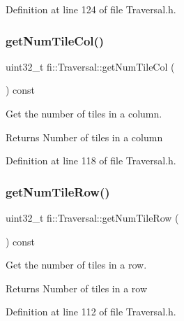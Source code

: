 Definition at line 124 of file Traversal.\+h.

\mbox{\label{classfi_1_1Traversal_a10eeefd5098ddd5871617d4df9875255}} 
\subsubsection{\texorpdfstring{get\+Num\+Tile\+Col()}{getNumTileCol()}}
{\footnotesize\ttfamily uint32\+\_\+t fi\+::\+Traversal\+::get\+Num\+Tile\+Col (\begin{DoxyParamCaption}{ }\end{DoxyParamCaption}) const\hspace{0.3cm}{\ttfamily [inline]}}



Get the number of tiles in a column. 

\begin{DoxyReturn}{Returns}
Number of tiles in a column 
\end{DoxyReturn}


Definition at line 118 of file Traversal.\+h.

\mbox{\label{classfi_1_1Traversal_aa9489ae5b18fc732ea70e45660f5650c}} 
\subsubsection{\texorpdfstring{get\+Num\+Tile\+Row()}{getNumTileRow()}}
{\footnotesize\ttfamily uint32\+\_\+t fi\+::\+Traversal\+::get\+Num\+Tile\+Row (\begin{DoxyParamCaption}{ }\end{DoxyParamCaption}) const\hspace{0.3cm}{\ttfamily [inline]}}



Get the number of tiles in a row. 

\begin{DoxyReturn}{Returns}
Number of tiles in a row 
\end{DoxyReturn}


Definition at line 112 of file Traversal.\+h.

